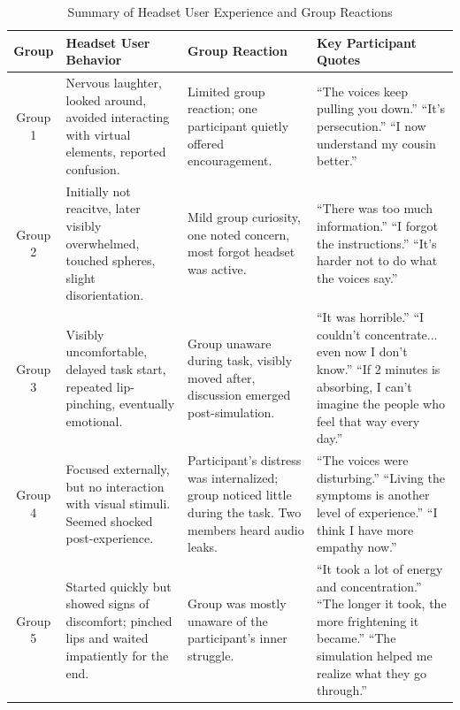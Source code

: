 \begin{table}[H]
\centering
\caption{Summary of Headset User Experience and Group Reactions}
\begin{tabular}{|c|p{4.2cm}|p{4.2cm}|p{4.8cm}|}
\hline
\textbf{Group} & \textbf{Headset User Behavior} & \textbf{Group Reaction} & \textbf{Key Participant Quotes} \\
\hline
Group 1 & Nervous laughter, looked around, avoided interacting with virtual elements, reported confusion. & Limited group reaction; one participant quietly offered encouragement. & “The voices keep pulling you down.” \newline “It’s persecution.” \newline “I now understand my cousin better.” \\
\hline
Group 2 & Initially not reacitve, later visibly overwhelmed, touched spheres, slight disorientation. & Mild group curiosity, one noted concern, most forgot headset was active. & “There was too much information.” \newline “I forgot the instructions.” \newline “It's harder not to do what the voices say.” \\
\hline
Group 3 & Visibly uncomfortable, delayed task start, repeated lip-pinching, eventually emotional. & Group unaware during task, visibly moved after, discussion emerged post-simulation. & “It was horrible.” \newline “I couldn't concentrate... even now I don't know.” \newline “If 2 minutes is absorbing, I can't imagine the people who feel that way every day.” \\
\hline
Group 4 & Focused externally, but no interaction with visual stimuli. Seemed shocked post-experience. & Participant’s distress was internalized; group noticed little during the task. Two members heard audio leaks. & “The voices were disturbing.” \newline “Living the symptoms is another level of experience.” \newline “I think I have more empathy now.” \\

\hline
Group 5 & Started quickly but showed signs of discomfort; pinched lips and waited impatiently for the end. & Group was mostly unaware of the participant’s inner struggle. & “It took a lot of energy and concentration.” \newline “The longer it took, the more frightening it became.” \newline “The simulation helped me realize what they go through.” \\

\hline
\end{tabular}
\label{tab:qual_summary}
\end{table}

